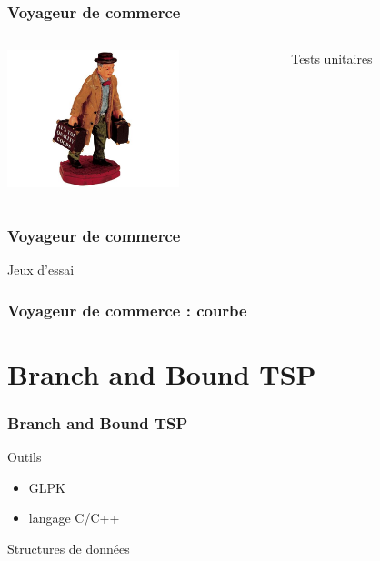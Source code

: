 \documentclass[french]{beamer}
\begin{document}
\begin{frame}
  \frametitle{Voyageur de commerce}
  \begin{columns}
    \begin{column}[]{5cm}
      \begin{center}
        \includegraphics[height=4cm]{salesman2.jpg}
      \end{center}
    \end{column}
      \begin{column}[]{5cm}
        \begin{block}{Tests unitaires}
        \end{block}
      \end{column}
    \end{columns}
  \end{frame}

\begin{frame}
\frametitle{Voyageur de commerce}
\begin{block}{Jeux d'essai}
\end{block}
\end{frame}

\begin{frame}
\frametitle{Voyageur de commerce : courbe}
\end{frame}

\section{Branch and Bound TSP}

\begin{frame}
  \frametitle{Branch and Bound TSP}
  \begin{block}{Outils}
    \begin{itemize}
    \item GLPK
    \item langage C/C++
    \end{itemize}
  \end{block}
  \begin{block}{Structures de données}
  \end{block}
\end{frame}
\end{document}
